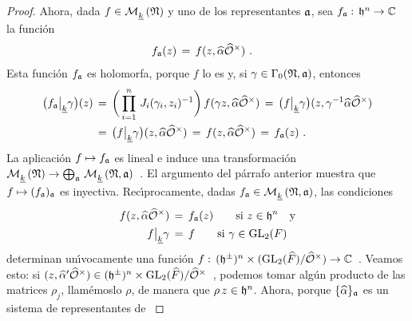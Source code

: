\begin{proof}
	Ahora, dada $f\in\modularH{k}{\frak{N}}$ y uno de los representantes
	$\frak{a}$, sea $f_{\frak{a}}:\,\hP^{n}\rightarrow\bb{C}$ la
	funci\'{o}n
	\begin{align*}
		f_{\frak{a}}(z) & \,=\,f(z,\hhat{\alpha}\Idfin{\cal{O}})
		\text{ .}
	\end{align*}
	Esta funci\'{o}n $f_{\frak{a}}$ es holomorfa, porque $f$ lo es y, si
	$\gamma\in\Gamma_{0}(\frak{N},\frak{a})$, entonces
	\begin{align*}
		\big(f_{\frak{a}}\operadormatrices{\peso{k}}{\gamma}\big)(z)
		& \,=\,\bigg(\prod_{i=1}^{n}\,J_{i}(\gamma_{i},z_{i})^{-1}
			\bigg)\,f(\gamma z,\hhat{\alpha}\Idfin{\cal{O}})
			\,=\,\big(f\operadormatrices{\peso{k}}{\gamma}\big)
				(z,\gamma^{-1}\hhat{\alpha}\Idfin{\cal{O}}) \\
		& \,=\,\big(f\operadormatrices{\peso{k}}{\gamma}\big)
			(z,\hhat{\alpha}\Idfin{\cal{O}})
			\,=\,f(z,\hhat{\alpha}\Idfin{\cal{O}})
			\,=\,f_{\frak{a}}(z)
		\text{ .}
	\end{align*}
	La aplicaci\'{o}n $f\mapsto f_{\frak{a}}$ es lineal e induce una
	transformaci\'{o}n
	\begin{math}
		\modularH{k}{\frak{N}}\rightarrow\bigoplus_{\frak{a}}\,
			\modularH{k}{\frak{N},\frak{a}}
	\end{math}~.
	El argumento del p\'{a}rrafo anterior muestra que
	$f\mapsto (f_{\frak{a}})_{\frak{a}}$ es inyectiva. Rec\'{\i}procamente,
	dadas $f_{\frak{a}}\in\modularH{k}{\frak{N},\frak{a}}$, las condiciones
	\begin{align*}
		f(z,\hhat{\alpha}\Idfin{\cal{O}}) & \,=\,f_{\frak{a}}(z)
			\qquad\text{si } z\in\hP^{n} \quad\text{y} \\
		f\operadormatrices{\peso{k}}{\gamma} & \,=\,f
			\qquad\text{si }\gamma\in\GL_{2}(F)
	\end{align*}
	determinan un\'{\i}vocamente una funci\'{o}n
	\begin{math}
		f:\,(\hP^{\pm})^{n}\times(\GL_{2}(\Adfin{F})/\Idfin{\cal{O}})
			\rightarrow\bb{C}
	\end{math}~.
	Veamos esto: si
	\begin{math}
		(z,\hhat{\alpha}'\Idfin{\cal{O}})\in
			(\hP^{\pm})^{n}\times\GL_{2}(\Adfin{F})/\Idfin{\cal{O}}
	\end{math}~,
	podemos tomar alg\'{u}n producto de las matrices $\rho_{j}$,
	llam\'{e}moslo $\rho$, de manera que $\rho\,z\in\hP^{n}$. Ahora, porque
	$\{\hhat{\alpha}\}_{\frak{a}}$ es un sistema de representantes de
	\begin{math}

\end{math}
\end{proof}
